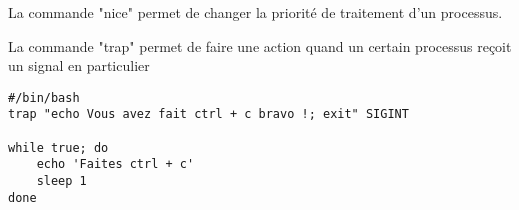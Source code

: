 \documentclass{article}
\begin{document}
La commande "nice" permet de changer la priorité de traitement d'un processus.

La commande "trap" permet de faire une action quand un certain processus reçoit un signal en particulier

\begin{verbatim}
#/bin/bash
trap "echo Vous avez fait ctrl + c bravo !; exit" SIGINT

while true; do
	echo 'Faites ctrl + c'
	sleep 1
done
\end{verbatim}
\end{document}
